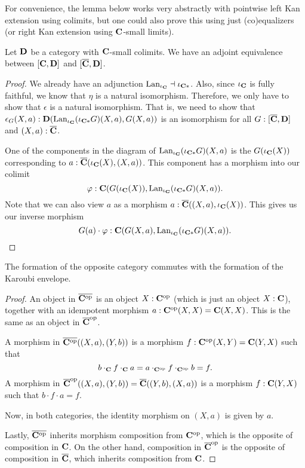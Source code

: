For convenience, the lemma below works very abstractly with pointwise left Kan extension using colimits, but one could also prove this using just (co)equalizers (or right Kan extension using $ \mathbf{C} $-small limits).
\begin{lemma}
  Let $ \mathbf{D} $ be a category with $ \mathbf{C} $-small colimits. We have an adjoint equivalence between $ [\mathbf{C}, \mathbf{D}] $ and $ [\overline {\mathbf{C}}, \mathbf{D}] $.
\end{lemma}
\begin{proof}
  We already have an adjunction $ \text{Lan}_{\iota_{\mathbf{C}}} \dashv \iota_{\mathbf{C}*} $. Also, since $ \iota_{\mathbf{C}} $ is fully faithful, we know that $ \eta $ is a natural isomorphism. Therefore, we only have to show that $ \epsilon $ is a natural isomorphism. That is, we need to show that $ \epsilon_G(X, a): \mathbf{D}(\text{Lan}_{\iota_{\mathbf{C}}}(\iota_{\mathbf{C}*} G) (X, a), G(X, a)) $ is an isomorphism for all $ G: [\overline {\mathbf{C}}, \mathbf{D}] $ and $ (X, a): \overline {\mathbf{C}} $.

  One of the components in the diagram of $ \text{Lan}_{\iota_{\mathbf{C}}}(\iota_{\mathbf{C}*} G) (X, a) $ is the $ G(\iota_{\mathbf{C}}(X)) $ corresponding to $ a: \overline {\mathbf{C}}(\iota_{\mathbf{C}}(X), (X, a)) $. This component has a morphism into our colimit
  \[ \varphi: \mathbf{C}(G(\iota_{\mathbf{C}}(X)), \text{Lan}_{\iota_{\mathbf{C}}}(\iota_{\mathbf{C}*} G) (X, a)). \]
  Note that we can also view $ a $ as a morphism $ a: \overline {\mathbf{C}}((X, a), \iota_{\mathbf{C}}(X)) $. This gives us our inverse morphism
  \[ G(a) \cdot \varphi: \mathbf{C}(G(X, a), \text{Lan}_{\iota_{\mathbf{C}}}(\iota_{\mathbf{C}*} G) (X, a)). \]
\end{proof}

\begin{lemma}
  The formation of the opposite category commutes with the formation of the Karoubi envelope.
\end{lemma}
\begin{proof}
  An object in $ \overline{\mathbf{C}^{\text{op}}} $ is an object $ X: \mathbf{C}^{\text{op}} $ (which is just an object $ X: \mathbf{C} $), together with an idempotent morphism $ a: \mathbf{C}^{\text{op}}(X, X) = \mathbf{C}(X, X) $. This is the same as an object in $ \overline {\mathbf{C}}^{\text{op}} $.

  A morphism in $ \overline{\mathbf{C}^{\text{op}}}((X, a), (Y, b)) $ is a morphism $ f: \mathbf{C}^{\text{op}}(X, Y) = \mathbf{C}(Y, X) $ such that
  \[ b \cdot_{\mathbf{C}} f \cdot_{\mathbf{C}} a = a \cdot_{\mathbf{C}^{\text{op}}} f \cdot_{\mathbf{C}^{\text{op}}} b = f. \]
  A morphism in $ \overline {\mathbf{C}}^{\text{op}}((X, a), (Y, b)) = \overline {\mathbf{C}}((Y, b), (X, a)) $ is a morphism $ f: \mathbf{C}(Y, X) $ such that $ b \cdot f \cdot a = f $.

  Now, in both categories, the identity morphism on $ (X, a) $ is given by $ a $.

  Lastly, $ \overline {\mathbf{C}^{\text{op}}} $ inherits morphism composition from $ \mathbf{C}^{\text{op}} $, which is the opposite of composition in $ \mathbf{C} $. On the other hand, composition in $ \overline {\mathbf{C}}^{\text{op}} $ is the opposite of composition in $ \overline {\mathbf{C}} $, which inherits composition from $ \mathbf{C} $.
\end{proof}

